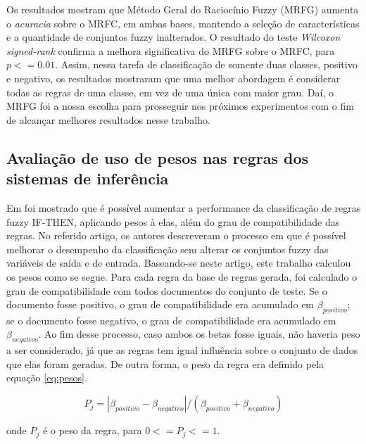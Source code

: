 %
%
%

Os resultados mostram que Método Geral do Raciocínio Fuzzy (MRFG) aumenta o \textit{acuracia} sobre o MRFC, em ambas bases,  mantendo a seleção de características e a quantidade de conjuntos fuzzy inalterados. O resultado do teste \textit{Wilcoxon signed-rank} confirma a melhora significativa do MRFG sobre o MRFC, para $p <= 0.01$. Assim, nessa tarefa de classificação de somente duas classes, positivo e negativo, os resultados mostraram que uma melhor abordagem é considerar todas as regras de uma classe, em vez de uma única com maior grau. Daí, o MRFG foi a nossa escolha para prosseguir nos próximos experimentos com o fim de alcançar melhores resultados nesse trabalho.

\subsection{Avaliação de uso de pesos nas regras dos sistemas de inferência}

Em \cite{ishibuchi2001effect} foi mostrado que é possível aumentar a performance da classificação de regras fuzzy IF-THEN, aplicando pesos à elas, além do grau de compatibilidade das regras. No referido artigo, os autores descreveram o processo em que é possível melhorar o desempenho da classificação sem alterar os conjuntos fuzzy das variáveis de saída e de entrada. Baseando-se neste artigo, este trabalho calculou os pesos como se segue. Para cada regra da base de regras gerada, foi calculado o grau de compatibilidade com todos documentos do conjunto de teste. Se o documento fosse positivo, o grau de compatibilidade era acumulado em $\beta_{positivo}$; se o documento fosse negativo, o grau de compatibilidade era acumulado em $\beta_{negativo}$. Ao fim desse processo, caso ambos os betas fosse iguais, não haveria peso a ser considerado, já que as regras tem igual influência sobre o conjunto de dados que elas foram geradas. De outra forma, o peso da regra era definido pela equação \ref{eq:pesos}.

\begin{equation}
P_j = |\beta_{positivo} - \beta_{negativo}| / (\beta_{positivo} + \beta_{negativo})
\label{eq:pesos}
\end{equation}

onde $P_j$ é o peso da regra, para $0 <= P_j <= 1$. 

